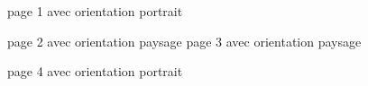 \documentclass[a4, 12pt]{article}
\begin{document}
	
	page 1 avec orientation portrait
	
	\begin{landscape}
		page 2 avec orientation paysage 
		\newpage
		page 3 avec orientation paysage
	\end{landscape}
	
	page 4 avec orientation portrait
\end{document}
